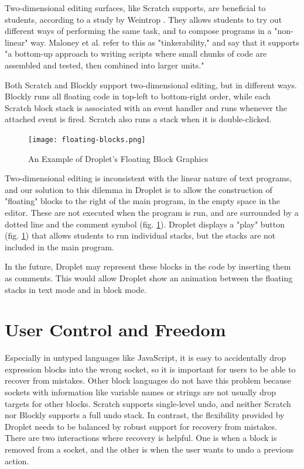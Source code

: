 \documentclass[conference]{IEEEtran}
\begin{document}
Two-dimensional editing surfaces, like Scratch supports, are beneficial to students, according to a study by Weintrop \cite{Weintrop}. They allows students to try out different ways of performing the same task, and to compose programs in a "non-linear" way. Maloney et al. \cite{Maloney} refer to this as "tinkerability," and say that it supports "a bottom-up approach to writing scripts where small chunks of code are assembled and tested, then combined into larger units."

Both Scratch and Blockly support two-dimensional editing, but in different ways. Blockly runs all floating code in top-left to bottom-right order, while each Scratch block stack is associated with an event handler and runs whenever the attached event is fired. Scratch also runs a stack when it is double-clicked.

\begin{figure}
\centering
\texttt{[image: floating-blocks.png]}
\caption{An Example of Droplet's Floating Block Graphics}
\label{floating}
\end{figure}

Two-dimensional editing is inconsistent with the linear nature of text programs, and our solution to this dilemma in Droplet is to allow the construction of "floating" blocks to the right of the main program, in the empty space in the editor. These are not executed when the program is run, and are surrounded by a dotted line and the comment symbol (fig. \ref{floating}). Droplet displays a "play" button (fig. \ref{floating}) that allows students to run individual stacks, but the stacks are not included in the main program.

In the future, Droplet may represent these blocks in the code by inserting them as comments. This would allow Droplet show an animation between the floating stacks in text mode and in block mode.

\section{User Control and Freedom}

Especially in untyped languages like JavaScript, it is easy to accidentally drop expression blocks into the wrong socket, so it is important for users to be able to recover from mistakes. Other block languages do not have this problem because sockets with information like variable names or strings are not usually drop targets for other blocks. Scratch supports single-level undo, and neither Scratch nor Blockly supports a full undo stack. In contrast, the flexibility provided by Droplet needs to be balanced by robust support for recovery from mistakes. There are two interactions where recovery is helpful. One is when a block is removed from a socket, and the other is when the user wants to undo a previous action.
\end{document}
